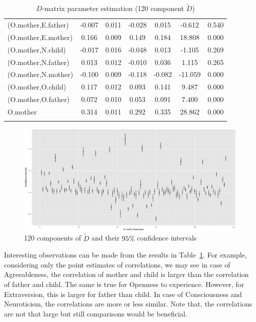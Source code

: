 \documentclass[11pt,a5paper,twoside]{book}
\begin{document}
\begin{center}
\begin{longtable}{lcccccc}
   (O.mother,E.father)  & -0.007 & 0.011 & -0.028 & 0.015 & -0.612 & 0.540 \\ 
   (O.mother,E.mother)  & 0.166 & 0.009 & 0.149 & 0.184 & 18.808 & 0.000 \\ 
   (O.mother,N.child)  & -0.017 & 0.016 & -0.048 & 0.013 & -1.105 & 0.269 \\ 
   (O.mother,N.father)  & 0.013 & 0.012 & -0.010 & 0.036 & 1.115 & 0.265 \\ 
   (O.mother,N.mother)  & -0.100 & 0.009 & -0.118 & -0.082 & -11.059 & 0.000 \\ 
   (O.mother,O.child)  & 0.117 & 0.012 & 0.093 & 0.141 & 9.487 & 0.000 \\ 
   (O.mother,O.father)  & 0.072 & 0.010 & 0.053 & 0.091 & 7.400 & 0.000 \\ 
   O.mother  & 0.314 & 0.011 & 0.292 & 0.335 & 28.862 & 0.000 \\ 
   \hline
   \caption{$D$-matrix parameter estimation (120 component $\tilde{D}$)}
\label{d_est}
\end{longtable}

\end{center}




\begin{figure}
\centering
\includegraphics[width=\textwidth]{d_param.eps}
\caption{120 components of $\tilde{D}$ and their $95\%$ confidence intervals} 
\label{d_ci}
\end{figure} 

Interesting observations can be made from the results in Table~\ref{d_est}. For example, considering only the point estimates of correlations, we may see in case of Agreeableness, the correlation of mother and child is larger than the correlation of father and child. The same is true for Openness to experience. However, for Extraversion, this is larger for father than child. In case of Consciousness and Neuroticism, the correlations are more or less similar. Note that, the correlations are not that large but still comparisons would be beneficial.
\end{document}
